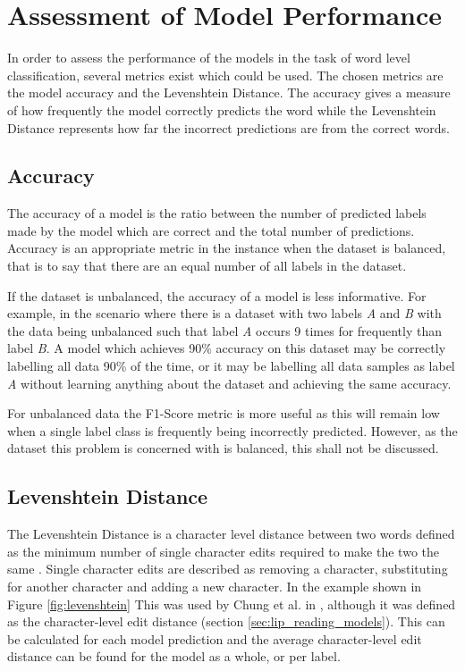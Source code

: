 \section{Assessment of Model Performance}\label{sec:class_assessment}
In order to assess the performance of the models in the task of word level classification, several metrics exist which could be used.
The chosen metrics are the model accuracy and the Levenshtein Distance.
The accuracy gives a measure of how frequently the model correctly predicts the word while the Levenshtein Distance represents how far the incorrect predictions are from the correct words.

\subsection{Accuracy}
The accuracy of a model is the ratio between the number of predicted labels made by the model which are correct and the total number of predictions.
Accuracy is an appropriate metric in the instance when the dataset is balanced, that is to say that there are an equal number of all labels in the dataset.

If the dataset is unbalanced, the accuracy of a model is less informative.
For example, in the scenario where there is a dataset with two labels \textit{A} and \textit{B} with the data being unbalanced such that label \textit{A} occurs 9 times for frequently than label \textit{B}.
A model which achieves 90\% accuracy on this dataset may be correctly labelling all data 90\% of the time, or it may be labelling all data samples as label \textit{A} without learning anything about the dataset and achieving the same accuracy.

For unbalanced data the F1-Score metric is more useful as this will remain low when a single label class is frequently being incorrectly predicted.
However, as the dataset this problem is concerned with is balanced, this shall not be discussed.

\subsection{Levenshtein Distance}
The Levenshtein Distance is a character level distance between two words defined as the minimum number of single character edits required to make the two the same \cite{Levenshtein1966}.
Single character edits are described as removing a character, substituting for another character and adding a new character.
In the example shown in Figure \ref{fig:levenshtein}
This was used by Chung et al. in \cite{Cheng2016}, although it was defined as the character-level edit distance (section \ref{sec:lip_reading_models}).
This can be calculated for each model prediction and the average character-level edit distance can be found for the model as a whole, or per label.

